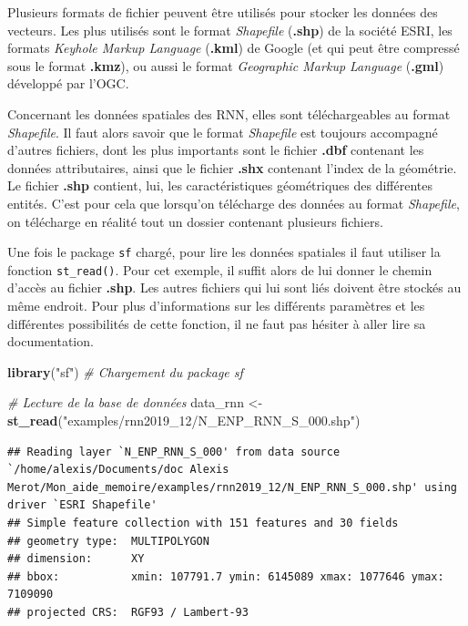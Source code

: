 \documentclass[
  french,
]{book}
\newenvironment{Shaded}{\begin{snugshade}}{\end{snugshade}}
\newcommand{\CommentTok}[1]{\textcolor[rgb]{0.56,0.35,0.01}{\textit{#1}}}
\newcommand{\KeywordTok}[1]{\textcolor[rgb]{0.13,0.29,0.53}{\textbf{#1}}}
\newcommand{\NormalTok}[1]{#1}
\newcommand{\StringTok}[1]{\textcolor[rgb]{0.31,0.60,0.02}{#1}}
\begin{document}
Plusieurs formats de fichier peuvent être utilisés pour stocker les données des
vecteurs. Les plus utilisés sont le format \emph{Shapefile} (\textbf{.shp}) de la société
ESRI, les formats \emph{Keyhole Markup Language} (\textbf{.kml}) de Google (et qui peut
être compressé sous le format \textbf{.kmz}), ou aussi le format \emph{Geographic Markup
Language} (\textbf{.gml}) développé par l'OGC.

Concernant les données spatiales des RNN, elles sont téléchargeables au format
\emph{Shapefile}. Il faut alors savoir que le format \emph{Shapefile} est toujours
accompagné d'autres fichiers, dont les plus importants sont le fichier \textbf{.dbf}
contenant les données attributaires, ainsi que le fichier \textbf{.shx} contenant
l'index de la géométrie. Le fichier \textbf{.shp} contient, lui, les caractéristiques
géométriques des différentes entités. C'est pour cela que lorsqu'on télécharge
des données au format \emph{Shapefile}, on télécharge en réalité tout un dossier
contenant plusieurs fichiers.



Une fois le package \texttt{sf} chargé, pour lire les données spatiales il faut
utiliser la fonction \texttt{st\_read()}. Pour cet exemple, il suffit alors de lui
donner le chemin d'accès au fichier \textbf{.shp}. Les autres fichiers qui lui sont
liés doivent être stockés au même endroit. Pour plus d'informations sur les
différents paramètres et les différentes possibilités de cette fonction, il ne
faut pas hésiter à aller lire sa documentation.

\begin{Shaded}
\begin{Highlighting}[]
\KeywordTok{library}\NormalTok{(}\StringTok{"sf"}\NormalTok{) }\CommentTok{\# Chargement du package sf}

\CommentTok{\# Lecture de la base de données}
\NormalTok{data\_rnn \textless{}{-}}\StringTok{ }\KeywordTok{st\_read}\NormalTok{(}\StringTok{"examples/rnn2019\_12/N\_ENP\_RNN\_S\_000.shp"}\NormalTok{)}
\end{Highlighting}
\end{Shaded}

\begin{verbatim}
## Reading layer `N_ENP_RNN_S_000' from data source `/home/alexis/Documents/doc Alexis Merot/Mon_aide_memoire/examples/rnn2019_12/N_ENP_RNN_S_000.shp' using driver `ESRI Shapefile'
## Simple feature collection with 151 features and 30 fields
## geometry type:  MULTIPOLYGON
## dimension:      XY
## bbox:           xmin: 107791.7 ymin: 6145089 xmax: 1077646 ymax: 7109090
## projected CRS:  RGF93 / Lambert-93
\end{verbatim}
\end{document}
